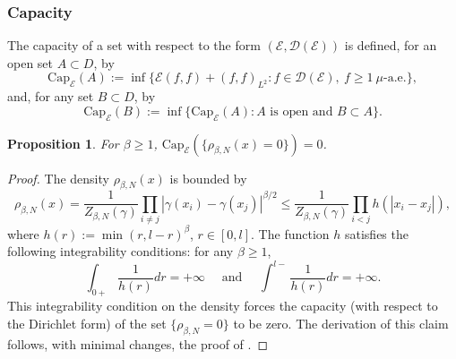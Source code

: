 \documentclass[11pt]{article}
\numberwithin{equation}{section}
\newtheorem{proposition}[theorem]{Proposition}
\theoremstyle{definition}
\begin{document}
\subsubsection*{Capacity}
The capacity of a set with respect to the form $(\mathcal{E}, \mathcal{D}(\mathcal{E}))$ is defined, for an open set $A\subset D$, by
\[
    \text{Cap}_{\mathcal{E}}(A):= \inf\{\mathcal{E}(f,f)+(f,f)_{L^{2}}: f\in\mathcal{D}(\mathcal{E}),\ f\ge 1 \ \mu\text{-a.e.}\},
\]
and, for any set $B\subset D$, by
\[
    \text{Cap}_{\mathcal{E}}(B):= \inf\{\text{Cap}_{\mathcal{E}}(A): A \text{ is open and }  B\subset A\}.
\]
\begin{proposition}\label{prop:capacity_zero}
    For $\beta \ge 1$, $\text{Cap}_{\mathcal{E}}(\{\rho_{\beta,N}(x)=0\})=0$.
\end{proposition}
\begin{proof}
The density $\rho_{\beta,N}(x)$ is bounded by 
\[
    \rho_{\beta,N}(x) = \frac{1}{Z_{\beta,N}(\gamma)}\prod\limits_{i\neq j}|\gamma(x_{i})-\gamma(x_{j})|^{\beta/2} 
    \le  \frac{1}{Z_{\beta,N}(\gamma)}\prod\limits_{i<j}h(|x_{i}-x_{j}|),
\]
where $h(r) := \min(r, l-r)^{\beta}$, $r\in [0,l]$. The function $h$ satisfies the following integrability conditions: for any $\beta\ge 1$,
\[
    \int_{0+}\frac{1}{h(r)}dr=+\infty\quad  \text{ and }\quad \int^{l-}\frac{1}{h(r)}dr=+\infty.
\]
This integrability condition on the density forces the capacity (with respect to the Dirichlet form) of the set $\{\rho_{\beta,N}=0\}$ to be zero. The derivation of this claim follows, with minimal changes, the proof of \cite[Proposition 2.1]{inukai2006collision}.
\end{proof}
\end{document}

